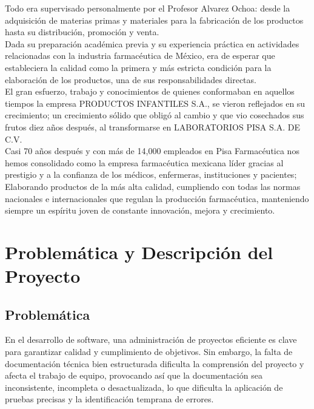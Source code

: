 \documentclass[12pt,letterpaper,spanish, xcolor=table]{report}
\numberwithin{figure}{subsection}
\begin{document}
Todo era supervisado personalmente por el Profesor Alvarez Ochoa: desde la adquisición de materias primas y materiales para la fabricación de los productos hasta su distribución, promoción y venta.\\ 

Dada su preparación académica previa y su experiencia práctica en actividades relacionadas con la industria farmacéutica de México, era de esperar que estableciera la calidad como la primera y más estricta condición para la elaboración de los productos, una de sus responsabilidades directas.\\

El gran esfuerzo, trabajo y conocimientos de quienes conformaban en aquellos tiempos la empresa PRODUCTOS INFANTILES S.A., se vieron reflejados en su crecimiento; un crecimiento sólido que obligó al cambio y que vio cosechados sus frutos diez años después, al transformarse en LABORATORIOS PISA S.A. DE C.V.\\  

Casi 70 años después y con más de 14,000 empleados en Pisa Farmacéutica nos hemos consolidado como la empresa farmacéutica mexicana líder gracias al prestigio y a la confianza de los médicos, enfermeras, instituciones y pacientes; Elaborando productos de la más alta calidad, cumpliendo con todas las normas nacionales e internacionales que regulan la producción farmacéutica, manteniendo siempre un espíritu joven de constante innovación, mejora y crecimiento.\\

\newpage
	
\chapter{Problemática y Descripción del Proyecto}
\newpage

\section{Problemática}

	En el desarrollo de software, una administración de proyectos eficiente es clave para garantizar calidad y cumplimiento de objetivos. Sin embargo, la falta de documentación técnica bien estructurada dificulta la comprensión del proyecto y afecta el trabajo de equipo, provocando así que la documentación sea inconsistente, incompleta o desactualizada, lo que dificulta la aplicación de pruebas precisas y la identificación temprana de errores.  \\
	
\end{document}
